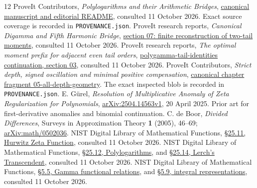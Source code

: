 \documentclass[11pt]{article}
\numberwithin{equation}{section}
\theoremstyle{definition}\newtheorem{definition}[theorem]{Definition}
\theoremstyle{remark}\newtheorem{remark}[theorem]{Remark}
\begin{document}
\clearpage
{}
{}
\begin{thebibliography}{12}
\small
{} ProveIt Contributors, \emph{Polylogarithms and their Arithmetic Bridges}, \href{https://github.com/VladimirReshetnikov/ProveIt/tree/main/Analysis/Polylogarithms/docs/manuscript}{canonical manuscript and editorial README}, consulted 11 October 2026. Exact source coverage is recorded in \texttt{PROVENANCE.json}.
 ProveIt research reports, \emph{Canonical Digamma and Fifth Harmonic Bridge}, \href{https://github.com/VladimirReshetnikov/ProveIt/blob/main/Analysis/Polylogarithms/docs/reports/stieltjes-harmonic-resonance/continuations/canonical-digamma-fifth/sections/07_tail_rank.tex}{section 07: finite reconstruction of two-tail moments}, consulted 11 October 2026.
 ProveIt research reports, \emph{The optimal moment prefix for adjacent even tail orders}, \href{https://github.com/VladimirReshetnikov/ProveIt/blob/main/Analysis/Polylogarithms/docs/reports/stieltjes-harmonic-resonance/continuations/polygamma-tail-identities/sections/03_harmonic_tails.tex}{polygamma-tail-identities continuation, section 03}, consulted 11 October 2026.
 ProveIt Contributors, \emph{Strict depth, signed oscillation and minimal positive compensation}, \href{https://github.com/VladimirReshetnikov/ProveIt/blob/main/Analysis/Polylogarithms/docs/manuscript/chapters/05-all-depth-geometry.tex}{canonical chapter fragment 05-all-depth-geometry}. The exact inspected blob is recorded in \texttt{PROVENANCE.json}.
 E. G\"urel, \emph{Resolution of Multiplicative Anomaly of Zeta Regularization for Polynomials}, \href{https://arxiv.org/abs/2504.14563}{arXiv:2504.14563v1}, 20 April 2025. Prior art for first-derivative anomalies and binomial continuation.
 C. de Boor, \emph{Divided Differences}, Surveys in Approximation Theory \textbf{1} (2005), 46--69; \href{https://arxiv.org/abs/math/0502036}{arXiv:math/0502036}.
 NIST Digital Library of Mathematical Functions, \href{https://dlmf.nist.gov/25.11}{\S25.11, Hurwitz Zeta Function}, consulted 11 October 2026.
 NIST Digital Library of Mathematical Functions, \href{https://dlmf.nist.gov/25.12}{\S25.12, Polylogarithms}, and \href{https://dlmf.nist.gov/25.14}{\S25.14, Lerch's Transcendent}, consulted 11 October 2026.
 NIST Digital Library of Mathematical Functions, \href{https://dlmf.nist.gov/5.5}{\S5.5, Gamma functional relations}, and \href{https://dlmf.nist.gov/5.9}{\S5.9, integral representations}, consulted 11 October 2026.
\end{thebibliography}
\end{document}
